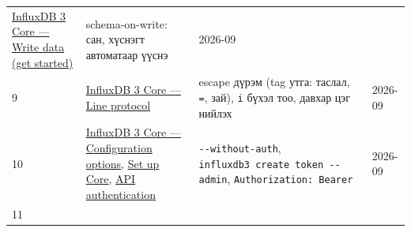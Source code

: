 \begin{longtable}[]{@{}llll@{}}
\begin{minipage}[t]{0.22\columnwidth}
\href{https://docs.influxdata.com/influxdb3/core/get-started/write/}{InfluxDB 3 Core --- Write data (get started)}\strut
\end{minipage} & \begin{minipage}[t]{0.22\columnwidth}\raggedright
schema-on-write: сан, хүснэгт автоматаар үүснэ\strut
\end{minipage} & \begin{minipage}[t]{0.22\columnwidth}\raggedright
2026-09\strut
\end{minipage}\tabularnewline
\begin{minipage}[t]{0.22\columnwidth}\raggedright
9\strut
\end{minipage} & \begin{minipage}[t]{0.22\columnwidth}\raggedright
\href{https://docs.influxdata.com/influxdb3/core/reference/line-protocol/}{InfluxDB 3 Core --- Line protocol}\strut
\end{minipage} & \begin{minipage}[t]{0.22\columnwidth}\raggedright
escape дүрэм (tag утга: таслал, \texttt{=}, зай), \texttt{i} бүхэл тоо, давхар цэг нийлэх\strut
\end{minipage} & \begin{minipage}[t]{0.22\columnwidth}\raggedright
2026-09\strut
\end{minipage}\tabularnewline
\begin{minipage}[t]{0.22\columnwidth}\raggedright
10\strut
\end{minipage} & \begin{minipage}[t]{0.22\columnwidth}\raggedright
\href{https://docs.influxdata.com/influxdb3/core/reference/config-options/}{InfluxDB 3 Core --- Configuration options}, \href{https://docs.influxdata.com/influxdb3/core/get-started/setup/}{Set up Core}, \href{https://docs.influxdata.com/influxdb3/core/api/authentication/}{API authentication}\strut
\end{minipage} & \begin{minipage}[t]{0.22\columnwidth}\raggedright
\texttt{-\/-without-auth}, \texttt{influxdb3\ create\ token\ -\/\allowbreak{}-admin}, \texttt{Authorization:\allowbreak{}\ Bearer}\strut
\end{minipage} & \begin{minipage}[t]{0.22\columnwidth}\raggedright
2026-09\strut
\end{minipage}\tabularnewline
\begin{minipage}[t]{0.22\columnwidth}\raggedright
11\strut
\end{minipage} & \begin{minipage}[t]{0.22\columnwidth}\raggedright

\end{minipage}
\end{longtable}
